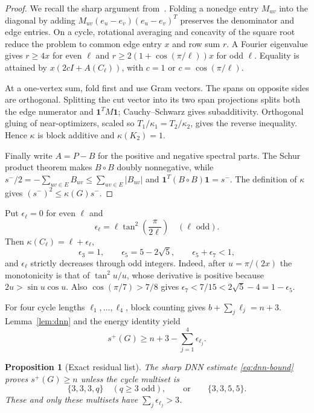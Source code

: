 \documentclass[11pt]{article}
\newtheorem{proposition}[theorem]{Proposition}
\theoremstyle{remark}
\newcommand{\one}{\mathbf 1}
\begin{document}
\begin{proof}
We recall the sharp argument from~\cite{SharpDNN}.  Folding a nonedge entry
$M_{uv}$ into the diagonal by adding
$M_{uv}(e_u-e_v)(e_u-e_v)^T$ preserves the denominator and edge entries.
On a cycle, rotational averaging and concavity of the square root reduce the
problem to common edge entry $x$ and row sum $r$.  A Fourier eigenvalue gives
$r\geq4x$ for even $\ell$ and
$r\geq2(1+\cos(\pi/\ell))x$ for odd $\ell$.  Equality is attained by
$x(2cI+A(C_\ell))$, with $c=1$ or $c=\cos(\pi/\ell)$.

At a one-vertex sum, fold first and use Gram vectors.  The spans on opposite
sides are orthogonal.  Splitting the cut vector into its two span projections
splits both the edge numerator and $\one^TM\one$; Cauchy--Schwarz gives
subadditivity.  Orthogonal gluing of near-optimizers, scaled so
$T_1/\kappa_1=T_2/\kappa_2$, gives the reverse inequality.  Hence $\kappa$ is
block additive and $\kappa(K_2)=1$.

Finally write $A=P-B$ for the positive and negative spectral parts.  The
Schur product theorem makes $B\circ B$ doubly nonnegative, while
$s^-/2=-\sum_{uv\in E}B_{uv}\leq\sum_{uv\in E}|B_{uv}|$ and
$\one^T(B\circ B)\one=s^-$.  The definition of $\kappa$ gives
$(s^-)^2\leq\kappa(G)s^-$.
\end{proof}

Put $\epsilon_\ell=0$ for even $\ell$ and
\[
 \epsilon_\ell=\ell\tan^2\!\left(\frac\pi{2\ell}\right)
 \quad(\ell\text{ odd}).
\]
Then $\kappa(C_\ell)=\ell+\epsilon_\ell$,
\begin{equation}\label{eq:eps}
 \epsilon_3=1,
 \qquad \epsilon_5=5-2\sqrt5,
 \qquad \epsilon_5+\epsilon_7<1,
\end{equation}
and $\epsilon_\ell$ strictly decreases through odd integers.  Indeed, after
$u=\pi/(2x)$ the monotonicity is that of $\tan^2u/u$, whose derivative is
positive because $2u>\sin u\cos u$.  Also
$\cos(\pi/7)>7/8$ gives
$\epsilon_7<7/15<2\sqrt5-4=1-\epsilon_5$.

For four cycle lengths $\ell_1,\ldots,\ell_4$, block counting gives
$b+\sum_j\ell_j=n+3$.  Lemma~\ref{lem:dnn} and the energy identity yield
\begin{equation}\label{eq:dnn-bound}
 s^+(G)\geq n+3-\sum_{j=1}^4\epsilon_{\ell_j}.
\end{equation}

\begin{proposition}[Exact residual list]\label{prop:residual}
The sharp DNN estimate \eqref{eq:dnn-bound} proves $s^+(G)\geq n$ unless the
cycle multiset is
\begin{equation}\label{eq:residual}
 \{3,3,3,q\}\quad(q\geq3\text{ odd}),
 \qquad\text{or}\qquad \{3,3,5,5\}.
\end{equation}
These and only these multisets have $\sum_j\epsilon_{\ell_j}>3$.
\end{proposition}
\end{document}
